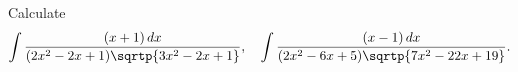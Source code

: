 Calculate
\[
\int \frac{(x + 1)\, dx}{(2x^{2} - 2x + 1) \sqrtp{3x^{2} - 2x + 1}},\quad
\int \frac{(x - 1)\, dx}{(2x^{2} - 6x + 5) \sqrtp{7x^{2} - 22x + 19}}.
\]

